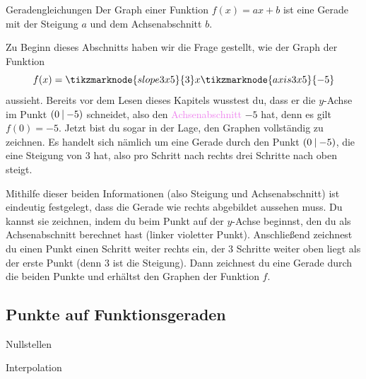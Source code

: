 \documentclass[../../main.tex]{subfiles}
\begin{document}
\begin{theorem}{Geradengleichungen}
    Der Graph einer Funktion $f(x)=ax+b$ ist eine Gerade mit der Steigung $a$ und dem Achsenabschnitt $b$.
\end{theorem}

\begin{example}{}
    Zu Beginn dieses Abschnitts haben wir die Frage gestellt, wie der Graph der Funktion 
    \[f(x)=\tikzmarknode{slope3x5}{3}x\tikzmarknode{axis3x5}{-5}\] 
    aussieht. Bereits vor dem Lesen dieses Kapitels wusstest du, dass er die $y$-Achse im Punkt $\left(0 \:\middle|\: -5\right)$ schneidet, also den \textcolor{violet}{Achsenabschnitt} $-5$ hat, denn es gilt $f(0)=-5$.
    Jetzt bist du sogar in der Lage, den Graphen vollständig zu zeichnen. Es handelt sich nämlich um eine Gerade durch den Punkt $\left(0 \:\middle|\: -5\right)$, die eine \textcolor{maincolor}{Steigung} von $3$ hat, also pro Schritt nach rechts drei Schritte nach oben steigt.

    Mithilfe dieser beiden Informationen (also Steigung und Achsenabschnitt) ist eindeutig festgelegt, dass die Gerade wie rechts abgebildet aussehen muss. Du kannst sie zeichnen, indem du beim Punkt auf der $y$-Achse beginnst, den du als Achsenabschnitt berechnet hast (linker violetter Punkt). Anschließend zeichnest du einen Punkt einen Schritt weiter rechts ein, der $3$ Schritte weiter oben liegt als der erste Punkt (denn $3$ ist die Steigung). Dann zeichnest du eine Gerade durch die beiden Punkte und erhältst den Graphen der Funktion $f$.
\end{example}

\subsection{Punkte auf Funktionsgeraden}

Nullstellen

Interpolation
\end{document}
